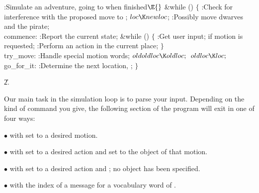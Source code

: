 \Y\B\4:Simulate an adventure, going to  when finished\X${}%
\E{}$\6
\&{while} ()\5
${}\{{}$\1\6
:Check for interference with the proposed move to \X;\6
${}\\{loc}\K\\{newloc}{}$;\6
:Possibly move dwarves and the pirate\X;\6
\4\\{commence}:\5
:Report the current state\X;\6
\&{while} ()\5
${}\{{}$\1\6
:Get user input;  if motion is requested\X;\6
:Perform an action in the current place\X;\6
\4${}\}{}$\2\6
\4\\{try\_move}:\5
:Handle special motion words\X;\6
${}\\{oldoldloc}\K\\{oldloc};{}$\6
${}\\{oldloc}\K\\{loc};{}$\6
\4\\{go\_for\_it}:\5
:Determine the next location, \X;\6
\4${}\}{}$\2\par
\U2.\fi

Our main task in the simulation loop is to parse your input.
Depending on the kind of command you give, the following section
of the program will exit in one of four ways:

\smallskip
\item{$\bullet$}  with  set to a desired
motion.

\item{$\bullet$}  with  set to a
desired action
and  set to the object of that motion.

\item{$\bullet$}  with  set to a
desired action
and ; no object has been specified.

\item{$\bullet$}  with  the
index of a message for a vocabulary word of .

